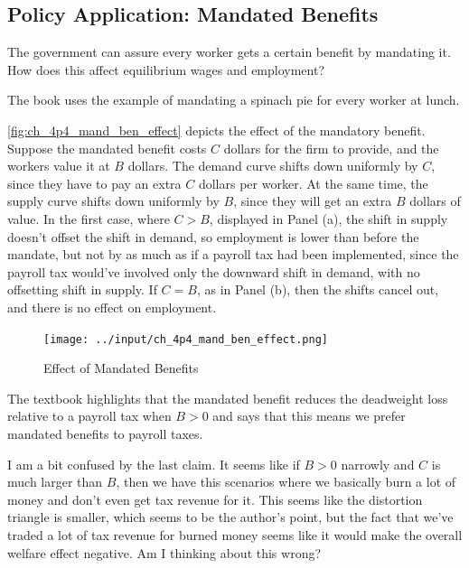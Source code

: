 \subsection{Policy Application: Mandated Benefits}

The government can assure every worker gets a 
certain benefit by mandating it.
How does this affect equilibrium 
wages and employment?

The book uses the example of mandating a 
spinach pie for every worker at lunch.

\autoref{fig:ch_4p4_mand_ben_effect}
depicts the effect of the mandatory benefit.
Suppose the mandated benefit costs $C$
dollars for the firm to provide, and the workers value it 
at $B$ dollars.
The demand curve shifts 
down uniformly by $C$, since they have to pay an extra $C$ dollars 
per worker. At the same time, the supply curve 
shifts down uniformly by $B$, since they will get an extra 
$B$ dollars of value.
In the first case, where $C > B$, 
displayed in Panel (a), the shift in supply doesn't offset 
the shift in demand, so employment is lower than before
the mandate, but not by as much as if a payroll tax had been implemented,
since the payroll tax would've involved only the downward shift in demand,
with no offsetting shift in supply.
If $C=B$, as in Panel (b), then the shifts cancel out,
and there is no effect on employment.


\FloatBarrier
\begin{figure}[!htb]
    \centering
        \texttt{[image: ../input/ch\_4p4\_mand\_ben\_effect.png]}
    \caption{Effect of Mandated Benefits}
    \label{fig:ch_4p4_mand_ben_effect}
\end{figure}
\FloatBarrier

The textbook highlights that the mandated benefit 
reduces the deadweight loss relative to a payroll tax
when $B > 0$ and says that this means we prefer 
mandated benefits to payroll taxes.

\begin{questions}
    I am a bit confused by the last claim. It seems like 
    if $B >0 $ narrowly and $C$ is much larger than $B$,
    then we have this scenarios where we basically
    burn a lot of money and don't even get tax revenue for it.
    This seems like the distortion triangle is smaller, which
    seems to be the author's point, but the fact that we've traded 
    a lot of tax revenue for burned money seems like 
    it would make the overall welfare effect negative.
    Am I thinking about this wrong?
\end{questions}

